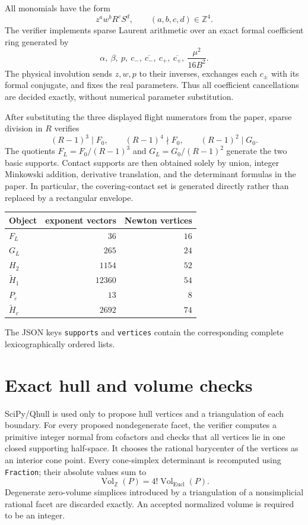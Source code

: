 \documentclass[11pt]{article}
\newcommand{\VolZ}{\operatorname{Vol}_{\mathbb Z}}
\begin{document}
All monomials have the form
\[
 z^aw^bR^cS^d,
 \qquad (a,b,c,d)\in\mathbb Z^4.
\]
The verifier implements sparse Laurent arithmetic over an exact formal coefficient ring generated by
\[
 \alpha,\ \beta,\ p,\ c_-,\ \overline{c_-},\
 c_+,\ \overline{c_+},\ \frac{\mu^2}{16B^2}.
\]
The physical involution sends $z,w,p$ to their inverses, exchanges each $c_\pm$ with its formal conjugate, and fixes the real parameters.  Thus all coefficient cancellations are decided exactly, without numerical parameter substitution.

After substituting the three displayed flight numerators from the paper, sparse division in $R$ verifies
\[
 (R-1)^3\mid F_0,
 \qquad
 (R-1)^4\nmid F_0,
 \qquad
 (R-1)^2\mid G_0.
\]
The quotients $F_L=F_0/(R-1)^3$ and $G_L=G_0/(R-1)^2$ generate the two basic supports.  Contact supports are then obtained solely by union, integer Minkowski addition, derivative translation, and the determinant formulas in the paper.  In particular, the covering-contact set is generated directly rather than replaced by a rectangular envelope.

\begin{center}
\begin{tabular}{@{}lrr@{}}
\toprule
Object & exponent vectors & Newton vertices\\
\midrule
$F_L$ & $36$ & $16$\\
$G_L$ & $265$ & $24$\\
$H_2$ & $1154$ & $52$\\
$\widetilde H_1$ & $12360$ & $54$\\
$P_\varepsilon$ & $13$ & $8$\\
$\widetilde H_c$ & $2692$ & $74$\\
\bottomrule
\end{tabular}
\end{center}
The JSON keys \texttt{supports} and \texttt{vertices} contain the corresponding complete lexicographically ordered lists.

\section{Exact hull and volume checks}

SciPy/Qhull is used only to propose hull vertices and a triangulation of each boundary.  For every proposed nondegenerate facet, the verifier computes a primitive integer normal from cofactors and checks that all vertices lie in one closed supporting half-space.  It chooses the rational barycenter of the vertices as an interior cone point.  Every cone-simplex determinant is recomputed using \texttt{Fraction}; their absolute values sum to
\[
 \VolZ(P)=4!\operatorname{Vol}_{\mathrm{Eucl}}(P).
\]
Degenerate zero-volume simplices introduced by a triangulation of a nonsimplicial rational facet are discarded exactly.  An accepted normalized volume is required to be an integer.
\end{document}

